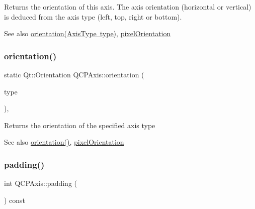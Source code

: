 Returns the orientation of this axis. The axis orientation (horizontal or vertical) is deduced from the axis type (left, top, right or bottom).

\begin{DoxySeeAlso}{See also}
\mbox{\hyperlink{class_q_c_p_axis_a9a68b3e45f1b1e33d4d807822342516c}{orientation(\+Axis\+Type type)}}, \mbox{\hyperlink{class_q_c_p_axis_a45c45bed7e5666683b8d56afa66fa51f}{pixel\+Orientation}} 
\end{DoxySeeAlso}
\mbox{\label{class_q_c_p_axis_a9a68b3e45f1b1e33d4d807822342516c}} 
\subsubsection{\texorpdfstring{orientation()}{orientation()}\hspace{0.1cm}{\footnotesize\ttfamily [2/2]}}
{\footnotesize\ttfamily static Qt\+::\+Orientation Q\+C\+P\+Axis\+::orientation (\begin{DoxyParamCaption}\item[{\mbox{\hyperlink{class_q_c_p_axis_ae2bcc1728b382f10f064612b368bc18a}{Axis\+Type}}}]{type }\end{DoxyParamCaption})\hspace{0.3cm}{\ttfamily [inline]}, {\ttfamily [static]}}

Returns the orientation of the specified axis type

\begin{DoxySeeAlso}{See also}
\mbox{\hyperlink{class_q_c_p_axis_ab988ef4538e2655bb77bd138189cd42e}{orientation()}}, \mbox{\hyperlink{class_q_c_p_axis_a45c45bed7e5666683b8d56afa66fa51f}{pixel\+Orientation}} 
\end{DoxySeeAlso}
\mbox{\label{class_q_c_p_axis_a07df379d5c017b8f3a4702532eb037b2}} 
\subsubsection{\texorpdfstring{padding()}{padding()}}
{\footnotesize\ttfamily int Q\+C\+P\+Axis\+::padding (\begin{DoxyParamCaption}{ }\end{DoxyParamCaption}) const\hspace{0.3cm}{\ttfamily [inline]}}

